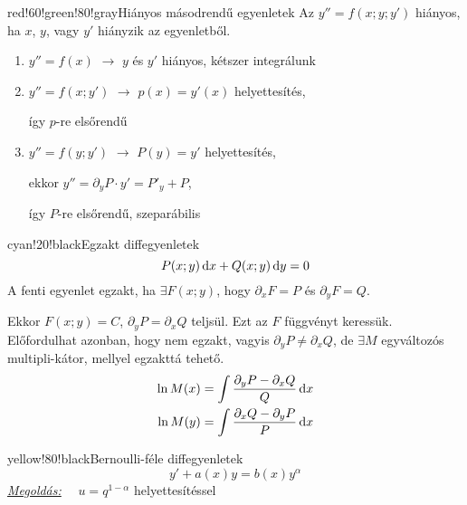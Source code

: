 \documentclass[main.tex]{subfiles}
\begin{document}
\begin{cbox}{red!60!green!80!gray}{Hiányos másodrendű egyenletek}
  Az $y'' = f(x; y; y')$ hiányos, ha $x$, $y$, vagy $y'$
  hiányzik az egyenletből.
  \begin{enumerate}
    \item $y'' = f(x)$
          \tabto{2.65cm} $\rightarrow$ \tabto{3.65cm}
          $y$ és $y'$ hiányos, kétszer integrálunk

    \item $y'' = f(x; y')$
          \tabto{2.65cm} $\rightarrow$ \tabto{3.65cm}
          $p(x) = y'(x)$ helyettesítés,

          \tabto{3.65cm}
          így $p$-re elsőrendű

    \item $y'' = f(y; y')$
          \tabto{2.65cm} $\rightarrow$ \tabto{3.65cm}
          $P(y) = y'$ helyettesítés,

          \tabto{3.65cm}
          ekkor $y'' = \partial_y P \cdot y' = P'_y + P$,

          \tabto{3.65cm}
          így $P$-re elsőrendű, szeparábilis
  \end{enumerate}
\end{cbox}



\begin{cbox}{cyan!20!black}{Egzakt diffegyenletek}
  \[
    P(x;y) \, \mathrm{d} x + Q(x;y) \, \mathrm{d} y = 0
  \]
  A fenti egyenlet egzakt, ha $\exists F(x;y)$, hogy
  $\partial_x F = P$ és $\partial_y F = Q$.

  Ekkor $F(x; y) = C$, $\partial_y P = \partial_x Q$
  teljsül. Ezt az $F$ függvényt keressük.
  \\[2mm]
  Előfordulhat azonban, hogy nem egzakt, vagyis
  $\partial_y P \neq \partial_x Q$, de $\exists M$
  egyváltozós multipli-kátor, mellyel egzakttá tehető.
  \begin{align*}
    \ln M(x)
     & = \int \frac{\partial_y P - \partial_x Q}{Q} \, \mathrm{d} x
    \\
    \ln M(y)
     & = \int \frac{\partial_x Q - \partial_y P}{P} \, \mathrm{d} x
  \end{align*}
\end{cbox}



\begin{cbox}{yellow!80!black}{Bernoulli-féle diffegyenletek}
  \[
    y' + a(x)y = b(x)y^\alpha
  \]
  \emph{\underline{Megoldás:}}
  $\quad u = q^{1-\alpha}$ helyettesítéssel
\end{cbox}
\end{document}
